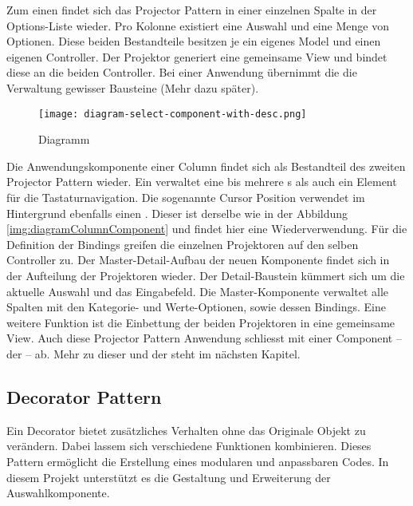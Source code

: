 Zum einen findet sich das Projector Pattern in einer einzelnen Spalte in der Options-Liste wieder.
Pro Kolonne existiert eine Auswahl und eine Menge von Optionen.
Diese beiden Bestandteile besitzen je ein eigenes Model und einen eigenen Controller.
Der Projektor generiert eine gemeinsame View und bindet diese an die beiden Controller.
Bei einer Anwendung übernimmt die  die Verwaltung gewisser Bausteine (Mehr dazu später).

\begin{figure}[!htb]
    \centering
    \texttt{[image: diagram-select-component-with-desc.png]}
    \caption{Diagramm }
    \label{img:diagramSelectComponent}
\end{figure}

Die Anwendungskomponente einer Column findet sich als Bestandteil des zweiten Projector Pattern wieder.
Ein  verwaltet eine bis mehrere s als auch ein Element für die Tastaturnavigation.
Die sogenannte Cursor Position verwendet im Hintergrund ebenfalls einen . 
Dieser ist derselbe wie in der Abbildung \ref{img:diagramColumnComponent} und findet hier eine Wiederverwendung.
Für die Definition der Bindings greifen die einzelnen Projektoren auf den selben Controller zu.
Der Master-Detail-Aufbau der neuen Komponente findet sich in der Aufteilung der Projektoren wieder.
Der Detail-Baustein kümmert sich um die aktuelle Auswahl und das Eingabefeld.
Die Master-Komponente verwaltet alle Spalten mit den Kategorie- und Werte-Optionen, sowie dessen Bindings.
Eine weitere Funktion ist die Einbettung der beiden Projektoren in eine gemeinsame View.
Auch diese Projector Pattern Anwendung schliesst mit einer Component – der  – ab.
Mehr zu dieser und der  steht im nächsten Kapitel.


\subsection{Decorator Pattern}
\label{sec:decoratorPattern}

Ein Decorator bietet zusätzliches Verhalten ohne das Originale Objekt zu verändern.
Dabei lassem sich verschiedene Funktionen kombinieren.
Dieses Pattern ermöglicht die Erstellung eines modularen und anpassbaren Codes.
In diesem Projekt unterstützt es die Gestaltung und Erweiterung der Auswahlkomponente.

